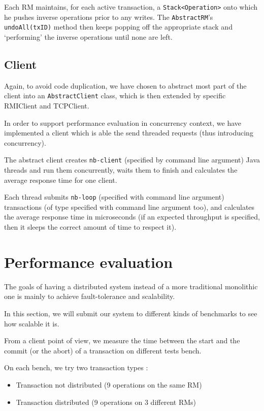 \documentclass[a4paper]{article}
\begin{document}
Each RM maintains, for each active transaction, a \texttt{Stack<Operation>} onto which he pushes inverse operations prior to any writes. The \texttt{AbstractRM}'s \texttt{undoAll(txID)} method then keeps popping off the appropriate stack
and `performing' the inverse operations until none are left. 

\subsection{Client}

Again, to avoid code duplication, we have chosen to abstract most part of the client into an \texttt{AbstractClient} class, which is then extended by specific RMIClient and TCPClient.

In order to support performance evaluation in concurrency context, we have implemented a client which is able the send threaded requests (thus introducing concurrency).

The abstract client creates \texttt{nb-client} (specified by command line argument) Java threads and run them concurrently, waits them to finish and calculates the average response time for one client.

Each thread submits \texttt{nb-loop} (specified with command line argument) transactions (of type specified with command line argument too), and calculates the average response time in microseconds (if an expected throughput is specified, then it sleeps the correct amount of time to respect it).

\section{Performance evaluation}
The goals of having a distributed system instead of a more traditional monolithic one is mainly to achieve fault-tolerance and scalability.

In this section, we will submit our system to different kinds of benchmarks to see how scalable it is.

From a client point of view, we measure the time between the start and the commit (or the abort) of a transaction on different tests bench.

On each bench, we try two transaction types :
\begin{itemize}
\item Transaction not distributed (9 operations on the same RM)
\item Transaction distributed (9 operations on 3 different RMs)
\end{itemize}
\end{document}
